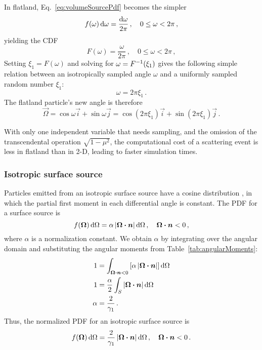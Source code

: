 In flatland, Eq.~\eqref{eq:volumeSourcePdf} becomes the simpler
\begin{equation*}
  f(\omega) \mathop{}\!\mathrm{d}\omega = \frac{\mathop{}\!\mathrm{d}\omega}{2\pi} \,,
  \quad 0 \le \omega < 2\pi\,,
\end{equation*}
yielding the CDF
\begin{equation}\label{eq:volumeSourceFlatland}
  F(\omega) = \frac{\omega}{2\pi}\,,
  \quad 0 \le \omega < 2\pi\,,
\end{equation}
Setting $\xi_1 = F(\omega)$ and solving for $\omega = F^{-1}(\xi_1)$ gives the
following simple relation between an isotropically sampled angle $\omega$ and a
uniformly sampled random number $\xi_1$:
\begin{equation*}
  \omega = 2\pi \xi_1\,.
\end{equation*}
The flatland particle's new angle is therefore
\begin{equation*}
  \vec{\Omega} = \cos \omega \vec{i} + \sin \omega \vec{j}
  = \cos(2\pi\xi_1) \vec{i} + \sin(2\pi\xi_1) \vec{j}\,.
\end{equation*}

With only one independent variable that needs sampling, and the omission of
the transcendental operation $\sqrt{1-\mu^2}$, the computational cost of a
scattering event is less in flatland than in 2-D, leading to
faster simulation times.

\subsubsection{Isotropic surface source}\label{sec:isoSurface}
Particles emitted from an isotropic surface source have a cosine distribution
\cite{Gre2002}, in which the partial first moment in each differential angle is
constant. The PDF for a surface source is
\begin{equation*}
  f(\bm{\Omega}) \mathop{}\!\mathrm{d}\Omega = \alpha \left| \bm{\Omega}\bm{\cdot} \bm{n} \right| \mathop{}\!\mathrm{d}\Omega \,,
\quad \bm{\Omega}\bm{\cdot} \bm{n} < 0 \,,
\end{equation*}
where $\alpha$ is a normalization constant. We obtain $\alpha$ by integrating over
the angular domain and substituting the angular moments from Table~\ref{tab:angularMoments}:
\begin{align*}
  1 &= \int_{\bm{\Omega}\bm{\cdot} \bm{n} < 0} \left[ \alpha \left| \bm{\Omega}\bm{\cdot}
  \bm{n} \right| \right] \mathop{}\!\mathrm{d}\Omega
  \\
  1 &=\frac{\alpha}{2} \int_{S} \left| \bm{\Omega}\bm{\cdot} \bm{n} \right| \mathop{}\!\mathrm{d}\Omega
  \\
  \alpha &= \frac{2}{\gamma_1}\,.
\end{align*}
Thus, the normalized PDF for an isotropic surface source is
\begin{equation}\label{eq:surfaceSourcePdf}
  f(\bm{\Omega}) \mathop{}\!\mathrm{d}\Omega = \frac{2}{\gamma_1} \left| \bm{\Omega}\bm{\cdot} \bm{n} \right| \mathop{}\!\mathrm{d}\Omega \,,
\quad \bm{\Omega}\bm{\cdot} \bm{n} < 0 \,.
\end{equation}

